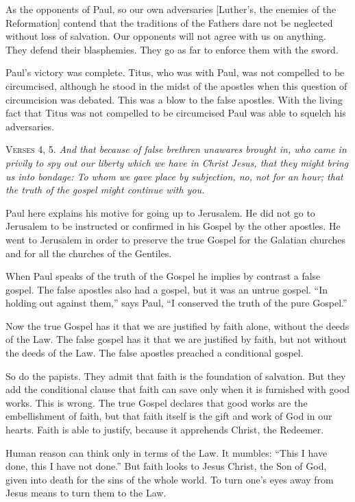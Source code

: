 As the opponents of Paul, so our own adversaries [Luther’s, the enemies of the Reformation] contend that the traditions of the Fathers dare not be neglected without loss of salvation. Our opponents will not agree with us on anything. They defend their blasphemies. They go as far to enforce them with the sword.

Paul’s victory was complete. Titus, who was with Paul, was not compelled to be circumcised, although he stood in the midst of the apostles when this question of circumcision was debated. This was a blow to the false apostles. With the living fact that Titus was not compelled to be circumcised Paul was able to squelch his adversaries.

\textsc{Verses} 4, 5. \emph{And that because of false brethren unawares brought in, who came in privily to spy out our liberty which we have in Christ Jesus, that they might bring us into bondage: To whom we gave place by subjection, no, not for an hour; that the truth of the gospel might continue with you.}

Paul here explains his motive for going up to Jerusalem. He did not go to Jerusalem to be instructed or confirmed in his Gospel by the other apostles. He went to Jerusalem in order to preserve the true Gospel for the Galatian churches and for all the churches of the Gentiles.

When Paul speaks of the truth of the Gospel he implies by contrast a false gospel. The false apostles also had a gospel, but it was an untrue gospel. “In holding out against them,” says Paul, “I conserved the truth of the pure Gospel.”

Now the true Gospel has it that we are justified by faith alone, without the deeds of the Law. The false gospel has it that we are justified by faith, but not without the deeds of the Law. The false apostles preached a conditional gospel.

So do the papists. They admit that faith is the foundation of salvation. But they add the conditional clause that faith can save only when it is furnished with good works. This is wrong. The true Gospel declares that good works are the embellishment of faith, but that faith itself is the gift and work of God in our hearts. Faith is able to justify, because it apprehends Christ, the Redeemer.

Human reason can think only in terms of the Law. It mumbles: “This I have done, this I have not done.” But faith looks to Jesus Christ, the Son of God, given into death for the sins of the whole world. To turn one’s eyes away from Jesus means to turn them to the Law.

